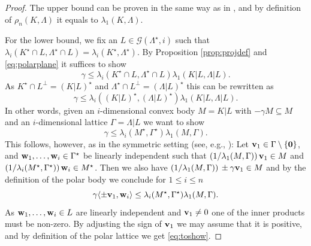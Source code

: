 \documentclass{amsart}
\theoremstyle{definition}
\theoremstyle{remark}
\numberwithin{equation}{section}
\begin{document}
\begin{proof} The upper bound can be proven in the same way as in \cite[Proposition 1.1]{hsx2021}, and by definition of $\rho_n(K,\Lambda)$ it equals to $\lambda_1(K,\Lambda)$. 

For the lower bound, we fix an $L \in\mathcal {G}(\Lambda^\star,i)$ such that 
$\lambda_i(K^\star\cap L,\Lambda^\star\cap L)=\lambda_i(K^\star,\Lambda^\star)$. By Proposition \ref{prop:projdef} and \eqref{eq:polarplane} it suffices to show 
$$ 
\gamma\leq \lambda_i(K^\star\cap L,\Lambda^\star\cap L)\lambda_1(K|L,\Lambda|L).
$$
As $K^\star\cap L^\perp=(K|L)^\star$ and $\Lambda^\star\cap L^\perp=(\Lambda|L)^\star$ this can be rewritten as 
$$ 
\gamma\leq \lambda_i((K|L)^\star,(\Lambda|L)^\star)\lambda_1(K|L,\Lambda|L).
$$
In other words, given an $i$-dimensional convex body $M=K|L$ with $-\gamma M\subseteq M$ and an $i$-dimensional lattice $\Gamma=\Lambda|L$ we want to show 
\begin{equation}
\gamma\leq \lambda_i(M^\star,\Gamma^\star)\lambda_1(M,\Gamma).
\label{eq:toshow} 
\end{equation}
This follows, however, as in the symmetric setting (see, e.g., \cite[Theorem 23.2]{gruber2007}): Let ${\bf v}_1\in\Gamma\setminus\{{\bf 0}\}$, and ${\bf w}_1,\dots,{\bf w}_i\in\Gamma^\star$ be linearly independent such that $(1/\lambda_1(M,\Gamma))\, {\bf v}_1\in M$ and $(1/\lambda_i(M^\star,\Gamma^\star))\,{\bf w}_i\in M^\star$.  Then we also have $(1/\lambda_1(M,\Gamma))\, \pm \gamma {\bf v}_1\in M$ and by the definition of the polar body we conclude for $1\leq i\leq n$
$$
\gamma\langle \pm {\bf v}_1,{\bf w}_i\rangle \leq \lambda_i(M^\star,\Gamma^\star)\lambda_1(M,\Gamma).                      $$
As ${\bf w}_1,\dots,{\bf w}_i\in L$ are linearly independent and ${\bf v}_1\ne 0$ one of the inner products must be non-zero. By adjusting the sign of ${\bf v}_1$ we may assume that it is positive, and by definition of the polar lattice we get \eqref{eq:toshow}. 


\end{proof}
\end{document}
